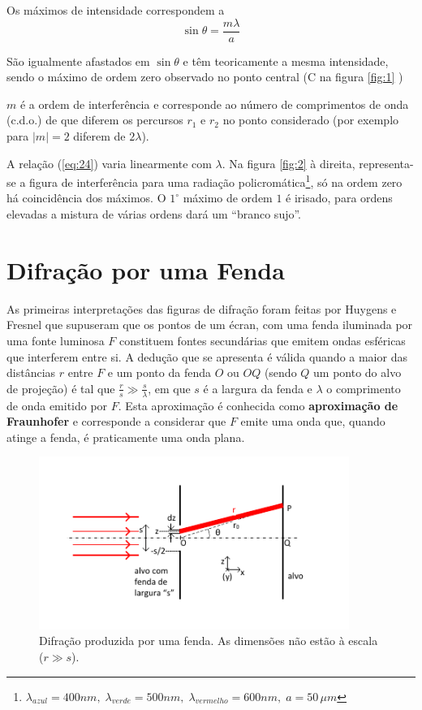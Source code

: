 \documentclass[a4paper,12pt]{article}
\begin{document}
Os máximos de intensidade correspondem a 
\begin{equation}
	\label{eq:24} \sin \theta = \frac{m \lambda}{a} 
\end{equation}

São igualmente afastados em $\sin \theta$ e têm teoricamente a mesma intensidade, sendo o máximo de ordem zero observado no ponto central (C na figura \ref{fig:1} )

$m$ é a ordem de interferência e corresponde ao número de comprimentos de onda (c.d.o.) de que diferem os percursos $r_1$ e $r_2$ no ponto considerado (por exemplo para $|m|=2$ diferem de $2\lambda$). 

A relação (\ref{eq:24}) varia linearmente com $\lambda$. Na figura \ref{fig:2} à direita, representa-se a figura de interferência para uma radiação policromática\footnote{$\lambda_{azul} = 400nm,\; \lambda_{verde} = 500nm,\; \lambda_{vermelho} = 600nm,\; a= 50\, \mu m$}, só na ordem zero há coincidência dos máximos. O $1^{\circ}$ máximo de ordem $1$ é irisado, para ordens elevadas a mistura de várias ordens dará um ``branco sujo''.


\section{ \sf Difração por uma Fenda}
\label{sec:fenda} 
As primeiras interpretações das figuras de difração foram feitas por Huygens e Fresnel que supuseram que os pontos de um écran, com uma fenda iluminada por uma fonte luminosa $F$ constituem fontes secundárias que emitem ondas esféricas que interferem entre si. A dedução que se apresenta é válida quando a maior das distâncias $r$ entre $F$ e um ponto da fenda $O$ ou $OQ$ (sendo $Q$ um ponto do alvo de projeção) é tal que $\frac{r}{s} \gg \frac{s}{\lambda}$, em que $s$ é a largura da fenda e $\lambda$ o comprimento de onda emitido por $F$. Esta aproximação é conhecida como {\bf aproximação de Fraunhofer} e corresponde a considerar que $F$ emite uma onda que, quando atinge a fenda, é praticamente uma onda plana.

\begin{figure}[tb]  \centering 
	\includegraphics[width=0.9\textwidth]{fenda} 
	\caption{Difração produzida por uma fenda. As dimensões não estão à escala ($r \gg s$).\label{fig:3}} 
\end{figure}
\end{document}
